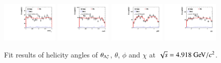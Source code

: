 \begin{figure}[H]\centering
    \includegraphics[width=0.24\textwidth]{figure/polarimetery/angular_plots/pkpi_4914_cos_theta0.pdf}
    \includegraphics[width=0.24\textwidth]{figure/polarimetery/angular_plots/pkpi_4914_cos_theta1.pdf}
    \includegraphics[width=0.24\textwidth]{figure/polarimetery/angular_plots/pkpi_4914_phi1.pdf}
    \includegraphics[width=0.24\textwidth]{figure/polarimetery/angular_plots/pkpi_4914_phi2.pdf}
    \caption{Fit results of helicity angles of $\theta_{\Lambda_{c}^{+}}$, $\theta$, $\phi$ and $\chi$ at $\sqrt{s} = 4.918\gev/c^2$.}
\label{fig:fit_angular_s11}
\end{figure}

